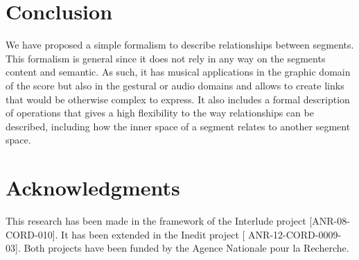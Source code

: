 \documentclass[letterpaper, 12pt]{article}
\newcommand{\raff}				{\ensuremath{\preccurlyeq}}
\newcommand{\variete}			{\ensuremath{\mathcal{V}}}
\newcommand{\fvariete}		{\ensuremath{[0,1[^{[0,1[}}}
\begin{document}
\section{Conclusion}
We have proposed a simple formalism to describe relationships between segments. This formalism is general since it does not rely in any way on the segments content and semantic. As such, it has musical applications in the graphic domain of the score but also in the gestural or audio domains and allows to create links that would be otherwise complex to express. It also includes a formal description of operations that gives a high flexibility to the way relationships can be described, including how the inner space of a segment relates to another segment space.



\section{Acknowledgments}
This research has been made in the framework of the Interlude project [ANR-08-CORD-010]. It has been extended in the Inedit project [ ANR-12-CORD-0009-03]. Both projects have been funded by the Agence Nationale pour la Recherche.




%
%
%
%
%
%
%
%


\ifdefined \acmversion

\fi

\ifdefined \cmjversion

\fi

\ifdefined \mamversion

\fi


\end{document}
